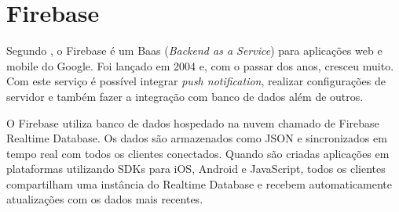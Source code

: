 \section{Firebase}
Segundo , o Firebase é um Baas (\textit{Backend as a Service}) para aplicações web e mobile do Google. Foi lançado em 2004 e, com o passar dos anos, cresceu muito. Com este serviço é possível integrar \textit{push notification}, realizar configurações de servidor e também fazer a integração com banco de dados além de outros.

O Firebase utiliza banco de dados hospedado na nuvem chamado de Firebase Realtime Database. Os dados são armazenados como JSON e sincronizados em tempo real com todos os clientes conectados. Quando são criadas aplicações em plataformas utilizando SDKs para iOS, Android e JavaScript, todos os clientes compartilham uma instância do Realtime Database e recebem automaticamente atualizações com os dados mais recentes.  \cite{firebase1} 






